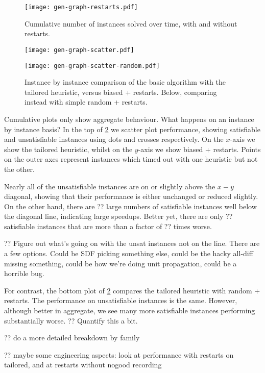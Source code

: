 \documentclass{article}
\begin{document}
\begin{figure}[p]
    \centering
    \texttt{[image: gen-graph-restarts.pdf]}

    \caption{Cumulative number of instances solved over time, with and without restarts.}
    \label{figure:restarts}
\end{figure}

\begin{figure}[p]
    \centering
    \texttt{[image: gen-graph-scatter.pdf]}

    \bigskip
    \centering
    \texttt{[image: gen-graph-scatter-random.pdf]}

    \caption{Instance by instance comparison of the basic algorithm with the tailored heuristic,
    versus biased + restarts. Below, comparing instead with simple random + restarts.}
    \label{figure:scatter}
\end{figure}

Cumulative plots only show aggregate behaviour. What happens on an instance by instance basis?  In
the top of \cref{figure:scatter} we scatter plot performance, showing satisfiable and unsatisfiable
instances using dots and crosses respectively. On the $x$-axis we show the tailored heuristic,
whilst on the $y$-axis we show biased + restarts. Points on the outer axes represent instances
which timed out with one heuristic but not the other.

Nearly all of the unsatisfiable instances are on or slightly above the $x-y$ diagonal, showing that
their performance is either unchanged or reduced slightly. On the other hand, there are ?? large
numbers of satisfiable instances well below the diagonal line, indicating large speedups. Better
yet, there are only ?? satisfiable instances that are more than a factor of ?? times worse.

?? Figure out what's going on with the unsat instances not on the line. There are a few options.
Could be SDF picking something else, could be the hacky all-diff missing something, could be how
we're doing unit propagation, could be a horrible bug.

For contrast, the bottom plot of \cref{figure:scatter} compares the tailored heuristic with random +
restarts. The performance on unsatisfiable instances is the same. However, although better in
aggregate, we see many more satisfiable instances performing substantially worse. ?? Quantify this a
bit.

?? do a more detailed breakdown by family

?? maybe some engineering aspects: look at performance with restarts on tailored, and at restarts
without nogood recording
\end{document}
